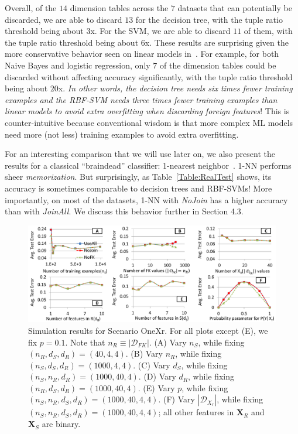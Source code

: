 \documentclass[sigconf]{acmart}
\begin{document}
Overall, of the $14$ dimension tables across the $7$ datasets that can potentially be discarded, we are able to discard $13$ for the decision tree, with 
the tuple ratio threshold being about $3$x. For the SVM, we are able to discard $11$ of them, with the tuple ratio threshold being about $6$x.
These results are surprising given the more conservative behavior seen on linear models in~\cite{hamlet}. For example, for both Naive Bayes and logistic regression, only 
$7$ of the dimension tables could be discarded without affecting accuracy significantly, with the tuple ratio threshold being about $20$x. \textit{In other words, the decision tree
needs six times fewer training examples and the RBF-SVM needs three times fewer training examples than linear models to avoid extra overfitting when discarding foreign features}! 
This is counter-intuitive because conventional wisdom is that more complex ML models need more (not less) training examples to avoid extra overfitting.

For an interesting comparison that we will use later on, we also present the results for a classical ``braindead'' classifier: 1-nearest neighbor~\cite{mitchellbook}. 
1-NN performs sheer \textit{memorization}. But surprisingly, as Table~\ref{Table:RealTest} shows,  its accuracy is sometimes comparable to decision trees and RBF-SVMs! 
More importantly, on most of the datasets, 1-NN with \textit{NoJoin} has a higher accuracy than with \textit{JoinAll}. We discuss this behavior further in Section 4.3.

\begin{figure}[t]
\centering
\includegraphics[width=0.85\linewidth]{onexr.pdf}
\vspace{-2mm}
\caption{Simulation results for Scenario OneXr. For all plots except (E), we fix $p = 0.1$. Note that $n_R \equiv |\mathcal{D}_{FK}|$.
(A) Vary $n_S$, while fixing $(n_R, d_S, d_R) = (40, 4, 4)$.
(B) Vary $n_R$, while fixing $(n_S, d_S, d_R) = (1000, 4, 4)$.
(C) Vary $d_S$, while fixing $(n_S, n_R, d_R) = (1000, 40, 4)$.
(D) Vary $d_R$, while fixing $(n_R, d_S, d_R) = (1000, 40, 4)$.
(E) Vary $p$,  while fixing $(n_S, n_R, d_S, d_R) = (1000, 40, 4, 4)$.
(F) Vary $|\mathcal{D}_{X_r}|$, while fixing $(n_S, n_R, d_S, d_R) = (1000, 40, 4, 4)$; all other features in $\textbf{X}_R$ and $\textbf{X}_S$ are binary.
}
\label{Figure:OneXrSimulation}
\end{figure}
\end{document}
